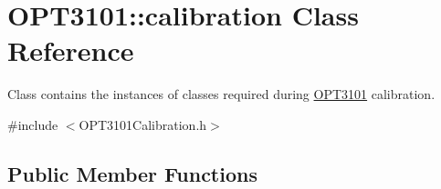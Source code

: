 \hypertarget{class_o_p_t3101_1_1calibration}{}\section{O\+P\+T3101\+:\+:calibration Class Reference}
\label{class_o_p_t3101_1_1calibration}


Class contains the instances of classes required during \mbox{\hyperlink{namespace_o_p_t3101}{O\+P\+T3101}} calibration.  




{\ttfamily \#include $<$O\+P\+T3101\+Calibration.\+h$>$}

\subsection*{Public Member Functions}
